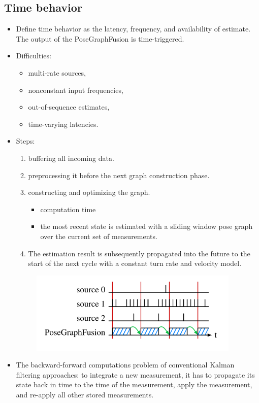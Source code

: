 \documentclass[letterpaper,11pt]{article}
\begin{document}
\subsection{Time behavior}

\begin{itemize}
	\item Define time behavior as the latency, frequency, and availability of estimate. The output of the PoseGraphFusion is time-triggered.
	\item Difficulties:
	\begin{itemize}
		\item multi-rate sources,
		\item nonconstant input frequencies,
		\item out-of-sequence estimates,
		\item time-varying latencies.
	\end{itemize}
	\item Steps:
	\begin{enumerate}
		\item buffering all incoming data.
		\item preprocessing it before the next graph construction phase.
		\item constructing and optimizing the graph.
		\begin{itemize}
			\item computation time
			\item the most recent state is estimated with a sliding window pose graph over the current set of measurements.
		\end{itemize}
		\item The estimation result is subsequently propagated into the future to the start of the next cycle with a constant turn rate and velocity model.
	\end{enumerate}
	\begin{figure}[!ht]
		\centering
		\includegraphics[width=10cm]{./img/timebehavior.png}
	\end{figure}
	\item The backward-forward computations problem of conventional Kalman filtering approaches: to integrate a new measurement, it has to propagate its state back in time to the time of the measurement, apply the measurement, and re-apply all other stored measurements.
\end{itemize}
\end{document}
